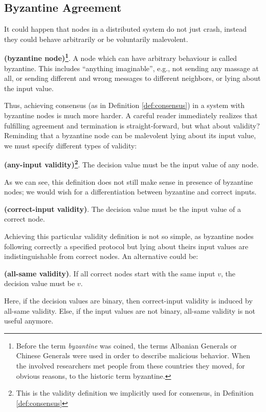 \subsection{Byzantine Agreement}
It could happen that nodes in a distributed system do not just crash, instead they could behave arbitrarily or be voluntarily malevolent.
\begin{mydef} {\bf (byzantine node)\footnote{Before the term \textit{byzantine} was coined, the terms Albanian Generals or Chinese Generals were used in order to describe malicious behavior. When the involved researchers met people from these countries they moved, for obvious reasons, to the historic term byzantine.}}.
    A node which can have arbitrary behaviour is called byzantine. This includes \enquote{anything imaginable}, e.g., not sending any massage at all, or sending different and wrong messages to different neighbors, or lying about the input value.
\end{mydef}
\noindent
Thus, achieving consensus (as in Definition \ref{def:consensus}) in a system with byzantine nodes is much more harder. A careful reader immediately realizes that fulfilling agreement and termination is straight-forward, but what about validity? Reminding that a byzantine node can be malevolent lying about its input value, we must specify different types of validity:
\begin{mydef}{\bf (any-input validity)\footnote{This is the validity definition we implicitly used for consensus, in Definition \ref{def:consensus}}}.
    The decision value must be the input value of any node.
\end{mydef}
\noindent
As we can see, this definition does not still make sense in presence of byzantine nodes; we would wish for a differentiation between byzantine and correct inputs.
\begin{mydef}{\bf (correct-input validity)}.
    The decision value must be the input value of a correct node.
\end{mydef}
\noindent
Achieving this particular validity definition is not so simple, as byzantine nodes following correctly a specified protocol but lying about theirs input values are indistinguishable from correct nodes. An alternative could be:
\begin{mydef}{\bf (all-same validity)}.
    If all correct nodes start with the same input $v$, the decision value must be $v$.
\end{mydef}
\noindent
Here, if the decision values are binary, then correct-input validity is induced by all-same validity. Else, if the input values are not binary, all-same validity is not useful anymore.


